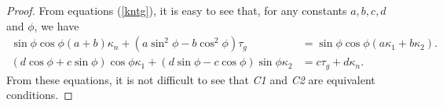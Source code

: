 \documentclass[10pt,a4paper]{amsart}
\begin{document}
\begin{proof}
From equations (\ref{kntg}), it is easy to see that, for any constants $a,b,c,d$ and $\phi$, we have
\begin{align}
\sin\phi\cos\phi(a+b)\kappa_n+(a\sin^2\phi-b\cos^2\phi)\tau_g &= \sin\phi\cos\phi(a\kappa_1+b\kappa_2).\label{(1)}\\
(d\cos\phi+c\sin\phi)\cos\phi\kappa_1+(d\sin\phi-c\cos\phi)\sin\phi\kappa_2 &= c\tau_g+d\kappa_n.\label{(2)}
\end{align}
From these equations, it is not difficult to see that \emph{C1} and \emph{C2} are equivalent conditions.
\end{proof}
\end{document}
